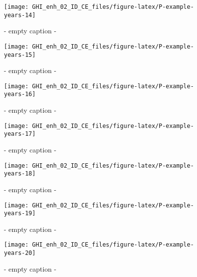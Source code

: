 \documentclass[
  10pt,
  a4paper,oneside]{article}
\begin{document}
\begin{figure}[H]

{\centering \texttt{[image: GHI\_enh\_02\_ID\_CE\_files/figure-latex/P-example-years-14]} 

}

\caption{ - empty caption - }\label{fig:P-example-years-14}
\end{figure}
\begin{figure}[H]

{\centering \texttt{[image: GHI\_enh\_02\_ID\_CE\_files/figure-latex/P-example-years-15]} 

}

\caption{ - empty caption - }\label{fig:P-example-years-15}
\end{figure}
\begin{figure}[H]

{\centering \texttt{[image: GHI\_enh\_02\_ID\_CE\_files/figure-latex/P-example-years-16]} 

}

\caption{ - empty caption - }\label{fig:P-example-years-16}
\end{figure}
\begin{figure}[H]

{\centering \texttt{[image: GHI\_enh\_02\_ID\_CE\_files/figure-latex/P-example-years-17]} 

}

\caption{ - empty caption - }\label{fig:P-example-years-17}
\end{figure}
\begin{figure}[H]

{\centering \texttt{[image: GHI\_enh\_02\_ID\_CE\_files/figure-latex/P-example-years-18]} 

}

\caption{ - empty caption - }\label{fig:P-example-years-18}
\end{figure}
\begin{figure}[H]

{\centering \texttt{[image: GHI\_enh\_02\_ID\_CE\_files/figure-latex/P-example-years-19]} 

}

\caption{ - empty caption - }\label{fig:P-example-years-19}
\end{figure}
\begin{figure}[H]

{\centering \texttt{[image: GHI\_enh\_02\_ID\_CE\_files/figure-latex/P-example-years-20]} 

}

\caption{ - empty caption - }\label{fig:P-example-years-20}
\end{figure}
\end{document}
